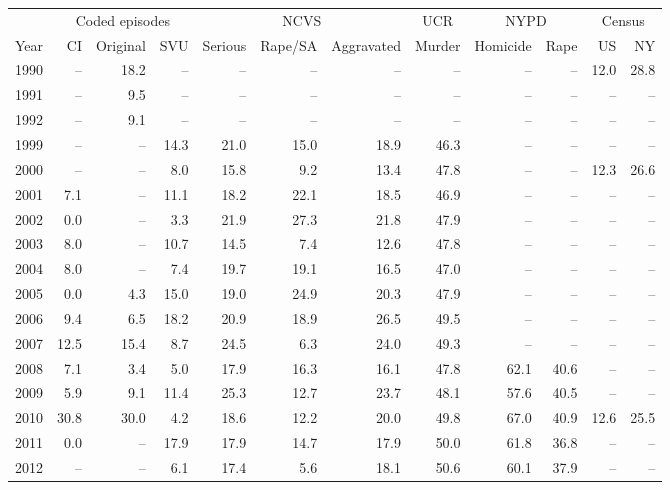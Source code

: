 \begin{center}
\label{tab:v_race}
\small
\setlength{\tabcolsep}{3.5pt}
\renewcommand{\arraystretch}{1.08}
\begin{tabular}{@{}rrrrrrrrrrrr@{}}
\toprule
 & \multicolumn{3}{c}{Coded episodes} & \multicolumn{3}{c}{NCVS} & \multicolumn{1}{c}{UCR} & \multicolumn{2}{c}{NYPD} & \multicolumn{2}{c}{Census} \\
\cmidrule(lr){2-4}
\cmidrule(lr){5-7}
\cmidrule(lr){8-8}
\cmidrule(lr){9-10}
\cmidrule(lr){11-12}
Year & CI & Original & SVU & Serious & Rape/SA & Aggravated & Murder & Homicide & Rape & US & NY \\
\midrule
1990 & -- & 18.2 & -- & -- & -- & -- & -- & -- & -- & 12.0 & 28.8 \\
1991 & -- & 9.5 & -- & -- & -- & -- & -- & -- & -- & -- & -- \\
1992 & -- & 9.1 & -- & -- & -- & -- & -- & -- & -- & -- & -- \\
1999 & -- & -- & 14.3 & 21.0 & 15.0 & 18.9 & 46.3 & -- & -- & -- & -- \\
2000 & -- & -- & 8.0 & 15.8 & 9.2 & 13.4 & 47.8 & -- & -- & 12.3 & 26.6 \\
2001 & 7.1 & -- & 11.1 & 18.2 & 22.1 & 18.5 & 46.9 & -- & -- & -- & -- \\
2002 & 0.0 & -- & 3.3 & 21.9 & 27.3 & 21.8 & 47.9 & -- & -- & -- & -- \\
2003 & 8.0 & -- & 10.7 & 14.5 & 7.4 & 12.6 & 47.8 & -- & -- & -- & -- \\
2004 & 8.0 & -- & 7.4 & 19.7 & 19.1 & 16.5 & 47.0 & -- & -- & -- & -- \\
2005 & 0.0 & 4.3 & 15.0 & 19.0 & 24.9 & 20.3 & 47.9 & -- & -- & -- & -- \\
2006 & 9.4 & 6.5 & 18.2 & 20.9 & 18.9 & 26.5 & 49.5 & -- & -- & -- & -- \\
2007 & 12.5 & 15.4 & 8.7 & 24.5 & 6.3 & 24.0 & 49.3 & -- & -- & -- & -- \\
2008 & 7.1 & 3.4 & 5.0 & 17.9 & 16.3 & 16.1 & 47.8 & 62.1 & 40.6 & -- & -- \\
2009 & 5.9 & 9.1 & 11.4 & 25.3 & 12.7 & 23.7 & 48.1 & 57.6 & 40.5 & -- & -- \\
2010 & 30.8 & 30.0 & 4.2 & 18.6 & 12.2 & 20.0 & 49.8 & 67.0 & 40.9 & 12.6 & 25.5 \\
2011 & 0.0 & -- & 17.9 & 17.9 & 14.7 & 17.9 & 50.0 & 61.8 & 36.8 & -- & -- \\
2012 & -- & -- & 6.1 & 17.4 & 5.6 & 18.1 & 50.6 & 60.1 & 37.9 & -- & -- \\

\end{tabular}
\end{center}
